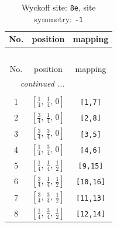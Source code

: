 \documentclass[fleqn,8pt]{jsarticle}
\begin{document}
\renewcommand{\arraystretch}{1.2}
\begin{longtable}{ccc}
\caption{Wyckoff site: {\tt 8e}, site symmetry: {\tt -1}}
 \\
 \hline \hline
No. & position & mapping \\ \hline \endfirsthead

\multicolumn{2}{l}{\tablename\ \thetable{}} \\
 \hline \hline
No. & position & mapping \\ \hline \endhead

 \hline \hline
\multicolumn{2}{r}{\footnotesize\it continued ...} \\ \endfoot

 \hline \hline
\multicolumn{2}{r}{} \\ \endlastfoot

1 & $\left[ \frac{1}{4},\, \frac{1}{4},\, 0 \right]$ & {\tt [1,7]} \\ \hline
2 & $\left[ \frac{3}{4},\, \frac{1}{4},\, 0 \right]$ & {\tt [2,8]} \\ \hline
3 & $\left[ \frac{3}{4},\, \frac{3}{4},\, 0 \right]$ & {\tt [3,5]} \\ \hline
4 & $\left[ \frac{1}{4},\, \frac{3}{4},\, 0 \right]$ & {\tt [4,6]} \\ \hline
5 & $\left[ \frac{1}{4},\, \frac{1}{4},\, \frac{1}{2} \right]$ & {\tt [9,15]} \\ \hline
6 & $\left[ \frac{3}{4},\, \frac{1}{4},\, \frac{1}{2} \right]$ & {\tt [10,16]} \\ \hline
7 & $\left[ \frac{3}{4},\, \frac{3}{4},\, \frac{1}{2} \right]$ & {\tt [11,13]} \\ \hline
8 & $\left[ \frac{1}{4},\, \frac{3}{4},\, \frac{1}{2} \right]$ & {\tt [12,14]} \\
\end{longtable}
\renewcommand{\arraystretch}{1.2}
\end{document}
